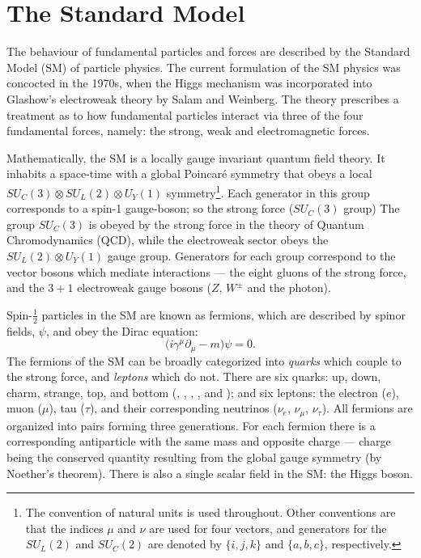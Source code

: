 \section{The Standard Model}
\label{sec:sm}
The behaviour of fundamental particles and forces are described by the Standard Model (SM) of
particle physics.
The current formulation of the SM physics was concocted in the 1970s, when the Higgs
mechanism was incorporated into Glashow's electroweak theory by Salam and Weinberg.
The theory prescribes a treatment
as to how fundamental particles interact via three of the four
fundamental forces, namely: the strong, weak and electromagnetic forces.

Mathematically, the SM is a locally gauge invariant quantum field theory.
It inhabits a space-time with a global Poincar\'e symmetry that obeys a local
$SU_C(3)\otimes SU_L(2)\otimes U_Y(1)$ symmetry\footnote{
The convention of natural units is used throughout.
Other conventions are that the indices $\mu$ and $\nu$ are used for four vectors, and generators
for the $SU_L(2)$ and $SU_C(2)$ are denoted by $\{i,j,k\}$ and $\{a,b,c\}$, respectively.}.
Each generator in this group corresponds to a spin-1 gauge-boson; so the strong force ($SU_C(3)$ group)
The group $SU_C(3)$ is obeyed by the strong force in the theory of Quantum Chromodynamics (QCD),
while the electroweak sector obeys the $SU_L(2)\otimes U_Y(1)$ gauge group.
Generators for each group correspond to the vector bosons which mediate
interactions --- the eight gluons of the strong force, and the $3+1$ electroweak gauge bosons ($Z$,
$W^\pm$ and the photon).

Spin-$\tfrac12$ particles in the SM are known as fermions,
which are described by spinor fields, $\psi$, and obey the Dirac equation:
\begin{equation}
  \big(i\gamma^\mu\partial_\mu - m\big)\psi = 0.
  \label{th:eq:dirac}
\end{equation}
The fermions of the SM can be broadly categorized into \emph{quarks} which couple to the strong
force, and \emph{leptons} which do not.
There are six quarks: up, down, charm, strange, top, and bottom (\uquark, \dquark, \cquark,
\squark, \tquark and \bquark); and six leptons: the electron ($e$), muon ($\mu$), tau ($\tau$), and
their corresponding neutrinos ($\nu_e$, $\nu_\mu$, $\nu_\tau$).
All fermions are organized into pairs forming three generations.
For each fermion there is a corresponding antiparticle with the same mass and opposite charge ---
charge being the conserved quantity resulting from the global gauge symmetry (by Noether's
theorem).
There is also a single scalar field in the SM: the Higgs boson.

